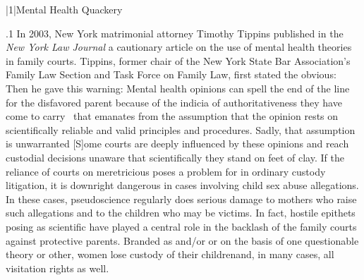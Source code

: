 \documentclass[11pt, twoside]{article}
\begin{document}
\thispagestyle{empty}

{\fontsize{13}{19}\selectfont


\hspace{-5em}\begin{minipage}{1.1\textwidth}
\begin{flushright}
{\fontsize{14}{22}\selectfont
\textbf{%
}
}
\end{flushright}
\end{minipage}


\vspace{6em}





\s|1|{Mental Health Quackery}

\p.1{%
\noindent{}In 2003, New York matrimonial attorney Timothy Tippins published in
the \textit{New York Law Journal} a cautionary article on the use of mental health
theories in family courts. Tippins, former chair of the New York State
Bar Association’s Family Law Section and Task Force on Family Law,
first stated the obvious:  Then he gave this warning:
Mental health opinions can spell the end of the line for the disfavored parent because of the indicia of authoritativeness they
have come to carry \ellThree{2pt}{2pt}\ that emanates from the assumption that
the opinion rests on scientifically reliable and valid principles and
procedures. Sadly, that assumption is unwarranted\ellFour{2pt}{2pt} [S]ome
courts are deeply influenced by these opinions and reach custodial
decisions unaware that scientifically they stand on feet of clay.
If the reliance of courts on meretricious  poses a problem for
 in ordinary custody litigation, it is downright
dangerous in cases involving child sex abuse allegations. In these cases,
pseudoscience regularly does serious damage to mothers who raise such
allegations and to the children who may be victims. In fact, hostile epithets posing as scientific  have played a central role in
the backlash of the family courts against protective parents. Branded as
   and/or   or  on the basis of one questionable theory or other,
women lose custody of their children\mdash{}and, in many cases, all visitation
rights as well.
}%

}
\end{document}
